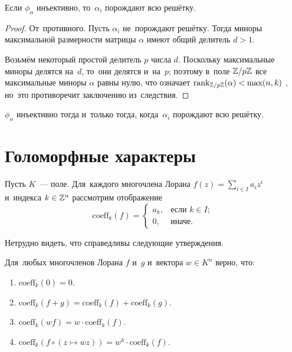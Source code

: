 \documentclass{article}
\begin{document}
\begin{lemma*}
    Если $\phi_\alpha$ инъективно, то~$\alpha_i$ порождают всю решётку.
\end{lemma*}

\begin{proof}
    От~противного. Пусть $\alpha_i$ не~порождают решётку. Тогда миноры максимальной размерности
    матрицы $\alpha$ имеют общий делитель $d > 1$.

    Возьмём некоторый простой делитель $p$ числа $d$. Поскольку максимальные миноры
    делятся на~$d$, то~они делятся и~на~$p$; поэтому в~поле $\mathbb{Z} / p \mathbb{Z}$
    все максимальные миноры $\alpha$ равны нулю, что означает $\mathrm{rank}_{\mathbb{Z} / p \mathbb{Z}}(\alpha) < \max(n, k)$ \cite{Brbk70},
    но~это противоречит заключению из~следствия.
\end{proof}

\begin{consequence*}
    $\phi_\alpha$ инъективно тогда и~только тогда, когда~$\alpha_i$ порождают всю решётку.
\end{consequence*}

\section{Голоморфные характеры}

Пусть $K$~— поле. Для~каждого многочлена Лорана $f(z) = \sum_{i \in I} a_i z^i$ и~индекса $k \in \mathbb{Z}^n$ рассмотрим отображение
$$
    \mathrm{coeff}_k(f) =
    \begin{cases}
        a_k, & \text{если $k \in I$}; \\
        0,   & \text{иначе.}
    \end{cases}
$$

Нетрудно видеть, что справедливы следующие утверждения.
\begin{lemma*}
    Для~любых многочленов Лорана $f$ и~$g$ и~вектора $w \in K^n$ верно, что:
    \begin{enumerate}
        \item $\mathrm{coeff}_k(0) = 0$.
        \item $\mathrm{coeff}_k(f + g) = \mathrm{coeff}_k(f) + \mathrm{coeff}_k(g)$.
        \item $\mathrm{coeff}_k(w f) = w \cdot \mathrm{coeff}_k(f)$.
        \item $\mathrm{coeff}_k(f \circ (z \mapsto wz)) = w^k \cdot \mathrm{coeff}_k(f)$.
    \end{enumerate}
\end{lemma*}
\end{document}
